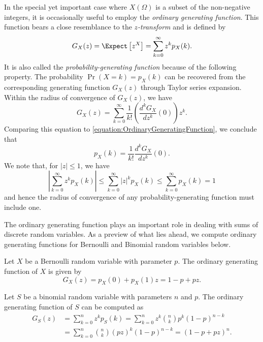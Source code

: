In the special yet important case where $X(\Omega)$ is a subset of the non-negative integers, it is occasionally useful to employ the \emph{ordinary generating function}. 
This function bears a close resemblance to the \emph{$z$-transform} and is defined by 
\begin{equation} \label{equation:OrdinaryGeneratingFunction}
G_X(z) = \Expect \left[ z^X \right] = \sum_{k=0}^{\infty} z^k p_X (k) .
\end{equation}
It is also called the \emph{probability-generating function} because of the following property. 
The probability $\Pr (X = k) = p_X(k)$ can be recovered from the corresponding generating function $G_X (z)$ through Taylor series expansion.
Within the radius of convergence of $G_X(z)$, we have
\begin{equation*}
G_X(z) = \sum_{k=0}^{\infty} \frac{1}{k!} \left( \frac{d^k G_X}{dz^k}(0) \right) z^k .
\end{equation*}
Comparing this equation to \eqref{equation:OrdinaryGeneratingFunction}, we conclude that
\begin{equation*}
p_X(k) = \frac{1}{k!} \frac{d^k G_X}{dz^k} (0) .
\end{equation*}
We note that, for $|z| \leq 1$, we have
\begin{equation*}
\left| \sum_{k=0}^{\infty} z^k p_X(k) \right|
\leq \sum_{k=0}^{\infty} |z|^k p_X(k)
\leq \sum_{k=0}^{\infty} p_X(k) = 1
\end{equation*}
and hence the radius of convergence of any probability-generating function must include one.

The ordinary generating function plays an important role in dealing with sums of discrete random variables.
As a preview of what lies ahead, we compute ordinary generating functions for Bernoulli and Binomial random variables below.

\begin{example}
Let $X$ be a Bernoulli random variable with parameter $p$.
The ordinary generating function of $X$ is given by
\begin{equation*}
G_X(z) = p_X(0) + p_X(1) z
= 1 - p + pz .
\end{equation*}
\end{example}

\begin{example}
Let $S$ be a binomial random variable with parameters $n$ and $p$.
The ordinary generating function of $S$ can be computed as
\begin{equation*}
\begin{split}
G_S(z) &= \sum_{k=0}^{n} z^k p_S (k)
= \sum_{k=0}^{n} z^k \binom{n}{k} p^k (1 - p)^{n-k} \\
&= \sum_{k=0}^{n} \binom{n}{k} (pz)^k (1 - p)^{n-k}
= (1 - p + pz)^n .
\end{split}
\end{equation*}
\end{example}

